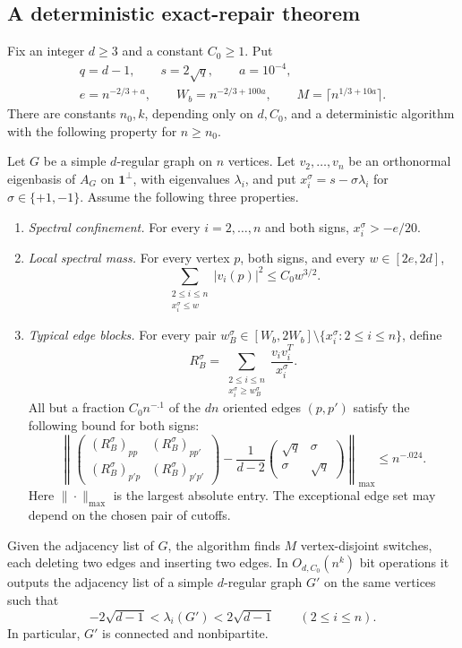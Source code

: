 \subsection{A deterministic exact-repair theorem}

\begin{theorem}
\label{thm:exact-repair}
Fix an integer $d\ge3$ and a constant $C_0\ge1$.  Put
\[
 \begin{gathered}
 q=d-1,\qquad s=2\sqrt q,\qquad a=10^{-4},\\
 e=n^{-2/3+a},\qquad W_b=n^{-2/3+100a},\qquad
 M=\lceil n^{1/3+10a}\rceil.
 \end{gathered}
\]
There are constants $n_0,k$, depending only on $d,C_0$, and a deterministic
algorithm with the following property for $n\ge n_0$.

Let $G$ be a simple $d$-regular graph on $n$ vertices.  Let
$v_2,\ldots,v_n$ be an orthonormal eigenbasis of $A_G$ on
$\mathbf1^\perp$, with eigenvalues $\lambda_i$, and put
$x_i^\sigma=s-\sigma\lambda_i$ for $\sigma\in\{+1,-1\}$.
Assume the following three properties.
\begin{enumerate}
\item \emph{Spectral confinement.} For every $i=2,\ldots,n$ and both signs,
$x_i^\sigma>-e/20$.
\item \emph{Local spectral mass.} For every vertex $p$, both signs, and every
$w\in[2e,2d]$,
\[
 \sum_{\substack{2\le i\le n\\x_i^\sigma\le w}}|v_i(p)|^2
 \le C_0w^{3/2}.
\]
\item \emph{Typical edge blocks.} For every pair
$w_B^\sigma\in[W_b,2W_b]\setminus\{x_i^\sigma:2\le i\le n\}$, define
\[
 R_B^\sigma=\sum_{\substack{2\le i\le n\\x_i^\sigma\ge w_B^\sigma}}
                 \frac{v_iv_i^T}{x_i^\sigma}.
\]
All but a fraction $C_0n^{-.1}$ of the $dn$ oriented edges $(p,p')$ satisfy
the following bound for both signs:
\[
 \left\|
 \begin{pmatrix}(R_B^\sigma)_{pp}&(R_B^\sigma)_{pp'}\\
                 (R_B^\sigma)_{p'p}&(R_B^\sigma)_{p'p'}\end{pmatrix}
 -\frac1{d-2}\begin{pmatrix}\sqrt q&\sigma\\\sigma&\sqrt q\end{pmatrix}
 \right\|_{\max}\le n^{-.024}.
\]
Here $\|\cdot\|_{\max}$ is the largest absolute entry.  The exceptional
edge set may depend on the chosen pair of cutoffs.
\end{enumerate}
Given the adjacency list of $G$, the algorithm finds $M$ vertex-disjoint
switches, each deleting two edges and inserting two edges.  In
$O_{d,C_0}(n^k)$ bit operations it outputs the adjacency list of a simple
$d$-regular graph $G'$ on the same vertices such that
\[
 -2\sqrt{d-1}<\lambda_i(G')<2\sqrt{d-1}
 \qquad (2\le i\le n).
\]
In particular, $G'$ is connected and nonbipartite.
\end{theorem}

